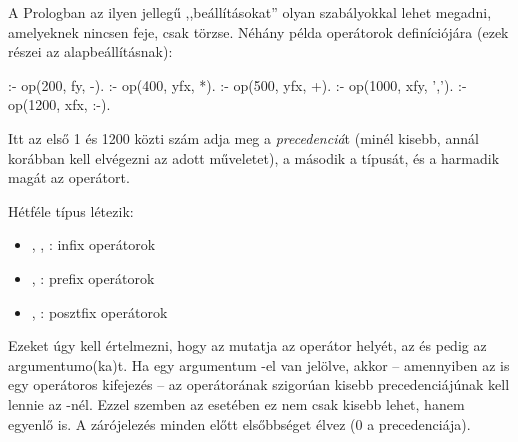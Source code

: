 A Prologban az ilyen jellegű ,,beállításokat'' olyan
szabályokkal lehet megadni, amelyeknek nincsen feje,
csak törzse. Néhány példa operátorok definíciójára
(ezek részei az alapbeállításnak):
\begin{program}
:- op(200, fy, -).
:- op(400, yfx, *).
:- op(500, yfx, +).
:- op(1000, xfy, ',').
:- op(1200, xfx, :-).
\end{program}
Itt az első 1 és 1200 közti szám adja meg a
\emph{precedenciá}\/t (minél kisebb, annál korábban
kell elvégezni az adott műveletet), a második a
típusát, és a harmadik magát az operátort.

Hétféle típus létezik:
\begin{itemize}
\item {}, , : infix operátorok
\item {}, : prefix operátorok
\item {}, : posztfix operátorok
\end{itemize}

Ezeket úgy kell értelmezni, hogy az  mutatja
az operátor helyét, az  és  pedig az
argumentumo(ka)t. Ha egy argumentum -el van
jelölve, akkor -- amennyiben az is egy operátoros
kifejezés -- az  operátorának szigorúan kisebb
precedenciájúnak kell lennie az -nél. Ezzel
szemben az  esetében ez nem csak kisebb lehet,
hanem egyenlő is. A zárójelezés minden előtt
elsőbbséget élvez (0 a precedenciája).

